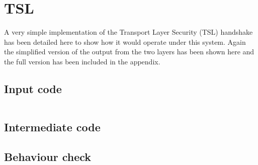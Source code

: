 \FloatBarrier
\section{TSL}

A very simple implementation of the Transport Layer Security (TSL) handshake has been detailed here to show how it would operate under this system. Again the simplified version of the output from the two layers has been shown here and the full version has been included in the appendix. 

\subsection{Input code}

\begin{lstlisting}
\end{lstlisting}

\subsection{Intermediate code}

\subsection{Behaviour check}